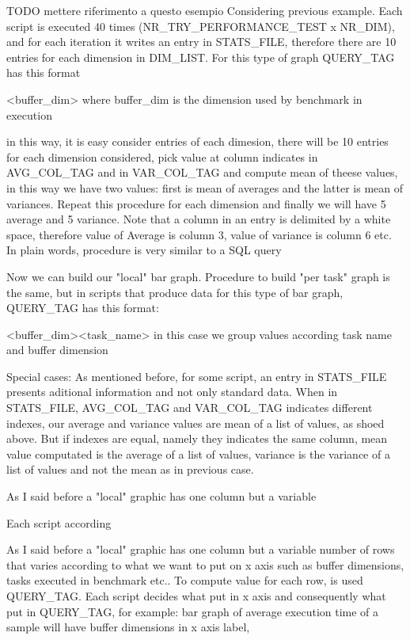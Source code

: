 \documentclass[a4paper,10pt]{article}
\begin{document}
\begin{multicols}{2}
TODO mettere riferimento a questo esempio
Considering previous example. Each script is executed 40 times 
(NR\_TRY\_PERFORMANCE\_TEST x NR\_DIM), and for each iteration 
it writes an entry in STATS\_FILE, therefore there are 10 entries for each 
dimension in DIM\_LIST. For this type of graph QUERY\_TAG has this format

<buffer\_dim> where buffer\_dim is the dimension used by benchmark in execution

in this way, it is easy consider entries of each dimesion, there will be 10 entries for each 
dimension considered, pick value at column indicates in AVG\_COL\_TAG  and in VAR\_COL\_TAG 
and compute mean of theese values, in this way we have two values: first is mean
of averages and the latter is mean of variances. Repeat this procedure for each dimension and finally we
will have 5 average and 5 variance. Note that a column in an entry is delimited by 
a white space, therefore value of Average is column 3, value of variance is column 6 etc.
In plain words, procedure is very similar to a SQL query

Now we can build our "local" bar graph. Procedure to build
"per task" graph is the same, but in scripts that produce data for this type of bar graph,
QUERY\_TAG has this format: 

<buffer\_dim><task\_name> in this case we group values according task name and buffer dimension

Special cases:
As mentioned before, for some script, an entry in STATS\_FILE presents aditional information 
and not only standard data. 
When in STATS\_FILE, AVG\_COL\_TAG and VAR\_COL\_TAG indicates different indexes, our average
and variance values are mean of a list of values, as shoed above. But if indexes are equal, namely 
they indicates the same column, mean value computated is the average of a list of values, variance
is the variance of a list of values and not the mean as in previous case.














As I said before a "local" graphic has one column but a variable

Each script according 

As I said before a "local" graphic has one column but a variable number of rows that varies 
according to what we want to put on x axis such as buffer dimensions, tasks executed in benchmark etc..
To compute value for each row, is used QUERY\_TAG. Each script decides what put in x axis
and consequently what put in QUERY\_TAG, for example: bar graph of average execution time
of a sample will have buffer dimensions in x axis label,  



\end{multicols}
\end{document}
